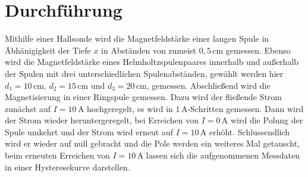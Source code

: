 \section{Durchführung}
\label{sec:Durchführung}
Mithilfe einer Hallsonde wird die Magnetfeldstärke einer langen Spule in Äbhänigigkeit der Tiefe $x$ in Abständen von zumeist $0,5\, \unit{\centi\meter}$ gemessen.
Ebenso wird die Magnetfeldstärke eines Helmholtzspulenpaares innerhalb und außerhalb der Spulen mit drei unterschiedlichen Spulenabständen, gewählt werden hier $d_1=10 \, \unit{\centi\meter}$, $d_2= 15\, \unit{\centi\meter}$ und
$d_3 = 20\, \unit{\centi\meter}$, gemessen.
Abschließend wird die Magnetisierung in einer Ringspule gemessen. Dazu wird der fließende Strom zunächst  auf $I = 10 \, \unit{\ampere}$ hochgeregelt, es wird in $1 \, \unit{\ampere}$-Schritten gemessen. Dann wird der Strom wieder 
heruntergeregelt, bei Erreichen von $I= 0 \, \unit{\ampere}$ wird die Polung der Spule umkehrt und der Strom wird erneut auf $I = 10 \, \unit{\ampere}$ erhöht. Schlussendlich wird er wieder auf null gebracht und die Pole werden ein weiteres Mal getauscht,
beim erneuten Erreichen von $I = 10 \, \unit{\ampere}$ lassen sich die aufgenommenen Messdaten in einer Hysteresekurve darstellen.
